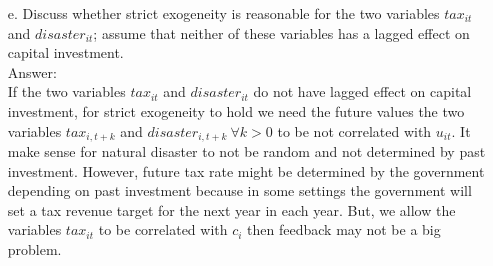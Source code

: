 \documentclass[10pt]{article}
\begin{document}
\begin{enumerate}
\item[e.] Discuss whether strict exogeneity is reasonable for the two variables $tax_{it}$ and $disaster_{it}$; assume that neither of these variables has a lagged effect on capital investment.
\\ Answer: \\ 
If the two variables $tax_{it}$ and $disaster_{it}$ do not have lagged effect on capital investment, for strict exogeneity to hold we need the future values the two variables $tax_{i,t+k}$ and $disaster_{i,t+k} \ \forall k>0$ to be not correlated with $u_{it}.$ It make sense for natural disaster to not be random and not determined by past investment. However, future tax rate might be determined by the government depending on past investment because in some settings the government will set a tax revenue target for the next year in each year. But, we allow the variables $tax_{it}$ to be correlated with $c_i$ then feedback may not be a big problem.
\end{enumerate}
\end{document}
